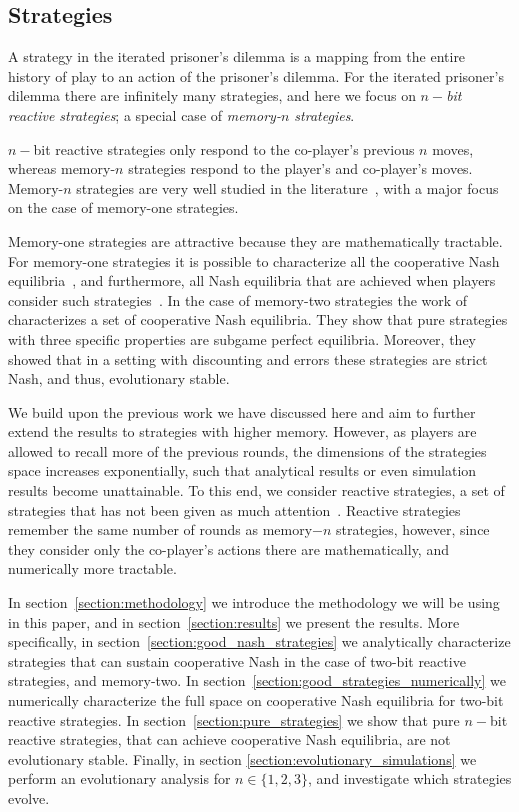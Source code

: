 \documentclass{article}
\theoremstyle{definition}
\begin{document}
\subsection{Strategies}

A strategy in the iterated prisoner's dilemma is a mapping from the entire history of
play to an action of the prisoner's dilemma. For the iterated prisoner's dilemma
there are infinitely many strategies, and here we focus on \textit{\(n-\)bit
reactive strategies}; a special case of \textit{memory-\(n\) strategies}.

\(n-\)bit reactive strategies only respond to the co-player's previous \(n\)
moves, whereas memory-\(n\) strategies respond to the player's and co-player's
moves. Memory-\(n\) strategies are very well studied in the
literature~\citep{baek:scientific:2016, hilbe:PNAS:2017,
glynatsi:scientific:2020, press:PNAS:2012, stewart:scientific:2016}, with a major
focus on the case of memory-one strategies.

Memory-one strategies are attractive because they are mathematically tractable.
For memory-one strategies it is possible to characterize all the cooperative
Nash equilibria~\citep{akin:EGADS:2016}, and furthermore, all Nash equilibria
that are achieved when players consider such
strategies~\citep{stewart:scientific:2016}. In the case of memory-two strategies
the work of~\citep{hilbe:PNAS:2017} characterizes a set of cooperative Nash equilibria.
They show that pure strategies with three specific properties are
subgame perfect equilibria. Moreover, they showed that in a setting with discounting
and errors these strategies are strict Nash, and thus, evolutionary stable.

We build upon the previous work we have discussed here and aim to further extend
the results to strategies with higher memory. However, as players are allowed to
recall more of the previous rounds, the dimensions of the strategies space
increases exponentially, such that analytical results or even simulation results
become unattainable. To this end, we consider reactive strategies,
a set of strategies that has not been given as much attention~\citep{baek:scientific:2016, sigmund:JTB:1989, wahl:JTB:1999}.
Reactive strategies remember
the same number of rounds as memory\(-n\) strategies, however, since they consider
only the co-player's actions there are mathematically, and numerically more
tractable.

In section~\ref{section:methodology} we introduce the methodology we will be
using in this paper, and in section~\ref{section:results} we present the
results. More specifically, in section~\ref{section:good_nash_strategies} we
analytically characterize strategies that can sustain cooperative Nash in the
case of two-bit reactive strategies, and memory-two. In
section~\ref{section:good_strategies_numerically} we numerically characterize
the full space on cooperative Nash equilibria for two-bit reactive strategies.
In section~\ref{section:pure_strategies} we show that pure \(n-\)bit reactive
strategies, that can achieve cooperative Nash equilibria, are not evolutionary stable. Finally, in section
\ref{section:evolutionary_simulations} we perform an evolutionary analysis for
\(n \in \{1, 2, 3\}\), and investigate which strategies evolve.
\end{document}
